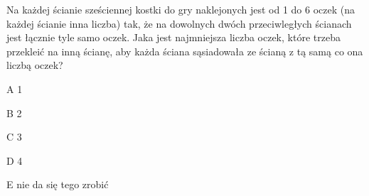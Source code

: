 \begin{tresc}
Na każdej ścianie sześciennej kostki do gry naklejonych jest od 1 do 6 oczek (na każdej ścianie inna liczba) tak, że na dowolnych dwóch przeciwległych ścianach jest łącznie tyle samo oczek. Jaka jest najmniejsza liczba oczek, które trzeba przekleić na inną ścianę, aby każda ściana sąsiadowała ze ścianą z tą samą co ona liczbą oczek?
\end{tresc}
\begin{wariant}{A} 1 \end{wariant}
\begin{wariant}{B} 2 \end{wariant}
\begin{wariant}{C} 3 \end{wariant}
\begin{wariant}{D} 4 \end{wariant}
\begin{wariant}{E} nie da się tego zrobić \end{wariant}
